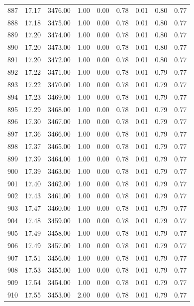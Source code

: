\documentclass{article}\usepackage[]{graphicx}\usepackage[]{color}
\begin{document}
\begin{longtable}{rrrrrrrrr}
  887 & 17.17 & 3476.00 & 1.00 & 0.00 & 0.78 & 0.01 & 0.80 & 0.77 \\ 
  888 & 17.18 & 3475.00 & 1.00 & 0.00 & 0.78 & 0.01 & 0.80 & 0.77 \\ 
  889 & 17.20 & 3474.00 & 1.00 & 0.00 & 0.78 & 0.01 & 0.80 & 0.77 \\ 
  890 & 17.20 & 3473.00 & 1.00 & 0.00 & 0.78 & 0.01 & 0.80 & 0.77 \\ 
  891 & 17.20 & 3472.00 & 1.00 & 0.00 & 0.78 & 0.01 & 0.80 & 0.77 \\ 
  892 & 17.22 & 3471.00 & 1.00 & 0.00 & 0.78 & 0.01 & 0.79 & 0.77 \\ 
  893 & 17.22 & 3470.00 & 1.00 & 0.00 & 0.78 & 0.01 & 0.79 & 0.77 \\ 
  894 & 17.23 & 3469.00 & 1.00 & 0.00 & 0.78 & 0.01 & 0.79 & 0.77 \\ 
  895 & 17.29 & 3468.00 & 1.00 & 0.00 & 0.78 & 0.01 & 0.79 & 0.77 \\ 
  896 & 17.30 & 3467.00 & 1.00 & 0.00 & 0.78 & 0.01 & 0.79 & 0.77 \\ 
  897 & 17.36 & 3466.00 & 1.00 & 0.00 & 0.78 & 0.01 & 0.79 & 0.77 \\ 
  898 & 17.37 & 3465.00 & 1.00 & 0.00 & 0.78 & 0.01 & 0.79 & 0.77 \\ 
  899 & 17.39 & 3464.00 & 1.00 & 0.00 & 0.78 & 0.01 & 0.79 & 0.77 \\ 
  900 & 17.39 & 3463.00 & 1.00 & 0.00 & 0.78 & 0.01 & 0.79 & 0.77 \\ 
  901 & 17.40 & 3462.00 & 1.00 & 0.00 & 0.78 & 0.01 & 0.79 & 0.77 \\ 
  902 & 17.43 & 3461.00 & 1.00 & 0.00 & 0.78 & 0.01 & 0.79 & 0.77 \\ 
  903 & 17.47 & 3460.00 & 1.00 & 0.00 & 0.78 & 0.01 & 0.79 & 0.77 \\ 
  904 & 17.48 & 3459.00 & 1.00 & 0.00 & 0.78 & 0.01 & 0.79 & 0.77 \\ 
  905 & 17.49 & 3458.00 & 1.00 & 0.00 & 0.78 & 0.01 & 0.79 & 0.77 \\ 
  906 & 17.49 & 3457.00 & 1.00 & 0.00 & 0.78 & 0.01 & 0.79 & 0.77 \\ 
  907 & 17.51 & 3456.00 & 1.00 & 0.00 & 0.78 & 0.01 & 0.79 & 0.77 \\ 
  908 & 17.53 & 3455.00 & 1.00 & 0.00 & 0.78 & 0.01 & 0.79 & 0.77 \\ 
  909 & 17.54 & 3454.00 & 1.00 & 0.00 & 0.78 & 0.01 & 0.79 & 0.77 \\ 
  910 & 17.55 & 3453.00 & 2.00 & 0.00 & 0.78 & 0.01 & 0.79 & 0.77 \\ 

\end{longtable}
\end{document}
